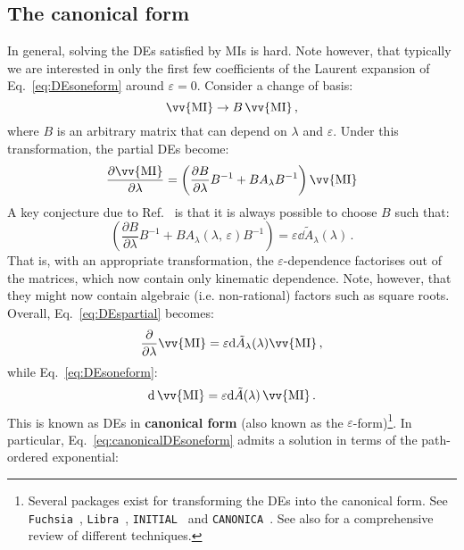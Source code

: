 \documentclass[main.tex]{subfiles}
\begin{document}
\subsection{The canonical form}
In general, solving the DEs satisfied by MIs is hard. Note however, that typically we are interested in only the first few coefficients of the Laurent expansion of Eq.~\ref{eq:DEsoneform} around $\varepsilon=0$. Consider a change of basis:
\begin{equation} \label{eq:basistransformation}
    \vv{\text{MI}} \rightarrow B\,\vv{\text{MI}}\,,
\end{equation}
where $B$ is an arbitrary matrix that can depend on $\lambda$ and $\varepsilon$. Under this transformation, the partial DEs become:
\begin{equation}
    \frac{\partial \vv{\text{MI}}}{\partial \lambda} = \left( \frac{\partial B}{\partial \lambda}B^{-1} + B A_{\lambda} B^{-1} \right) \vv{\text{MI}}
\end{equation}
A key conjecture due to Ref.~\cite{Henn:2013pwa} is that it is always possible to choose $B$ such that:
\begin{equation}
    \left( \frac{\partial B}{\partial \lambda}B^{-1} + B A_{\lambda}(\lambda, \, \varepsilon) B^{-1} \right) = \varepsilon \dd \tilde{A}_{\lambda}(\lambda)\,.
\end{equation}
That is, with an appropriate transformation, the $\varepsilon$-dependence factorises out of the matrices, which now contain only kinematic dependence. Note, however, that they might now contain algebraic (i.e. non-rational) factors such as square roots. Overall, Eq.~\ref{eq:DEspartial} becomes:
\begin{equation} \label{eq:canonicalDEspartial}
    \frac{\partial}{\partial \lambda} \vv{\text{MI}} = \varepsilon\dd \tilde{A}_{\lambda}(\lambda) \vv{\text{MI}}\,, 
\end{equation}
while Eq.~\ref{eq:DEsoneform}:
\begin{equation} \label{eq:canonicalDEsoneform}
    \dd \,\vv{\text{MI}} = \varepsilon \dd \tilde{A}(\lambda) \,\vv{\text{MI}}\,.
\end{equation}
This is known as DEs in \textbf{canonical form} (also known as the $\varepsilon$-form)\footnote{Several packages exist for transforming the DEs into the canonical form. See \texttt{Fuchsia}~\cite{Gituliar:2017vzm}, \texttt{Libra}~\cite{Lee:2020zfb}, \texttt{INITIAL}~\cite{Dlapa:2020cwj} and \texttt{CANONICA}~\cite{Meyer:2018feh}. See also \cite{Dlapa:2022nct} for a comprehensive review of different techniques.}. In particular, Eq.~\ref{eq:canonicalDEsoneform} admits a solution in terms of the path-ordered exponential:
\end{document}
